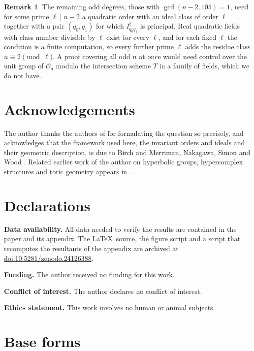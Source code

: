 \documentclass[11pt]{amsart}
\theoremstyle{definition}
\newtheorem{remark}[theorem]{Remark}
\newcommand{\OO}{\mathcal{O}}
\newcommand{\zenodoCodeDOI}{10.5281/zenodo.24126388}
\begin{document}
\begin{remark}
The remaining odd degrees, those with $\gcd(n-2,105)=1$, need for some prime $\ell\mid n-2$ a quadratic order with an ideal class of order $\ell$ together with a pair $(q_0,q_1)$ for which $I_{q_0q_1}^\ell$ is principal. Real quadratic fields with class number divisible by $\ell$ exist for every $\ell$, and for each fixed $\ell$ the condition is a finite computation, so every further prime $\ell$ adds the residue class $n\equiv2\pmod\ell$. A proof covering all odd $n$ at once would need control over the unit group of $\OO_d$ modulo the intersection scheme $T$ in a family of fields, which we do not have.
\end{remark}

\section*{Acknowledgements}
The author thanks the authors of \cite{BEGRS23} for formulating the question so precisely, and acknowledges that the framework used here, the invariant orders and ideals and their geometric description, is due to Birch and Merriman, Nakagawa, Simon and Wood \cite{BM72,Nak89,Sim01,Woo11,Woo14}. Related earlier work of the author on hyperbolic groups, hypercomplex structures and toric geometry appears in \cite{Bha22a,Bha22b,BSN26}.

\section*{Declarations}

\noindent\textbf{Data availability.} All data needed to verify the results are contained in the paper and its appendix. The \LaTeX\ source, the figure script and a script that recomputes the resultants of the appendix are archived at \href{https://doi.org/\zenodoCodeDOI}{doi:\zenodoCodeDOI}.

\smallskip\noindent\textbf{Funding.} The author received no funding for this work.

\smallskip\noindent\textbf{Conflict of interest.} The author declares no conflict of interest.

\smallskip\noindent\textbf{Ethics statement.} This work involves no human or animal subjects.

\appendix
\section{Base forms}\label{app:forms}
\end{document}
